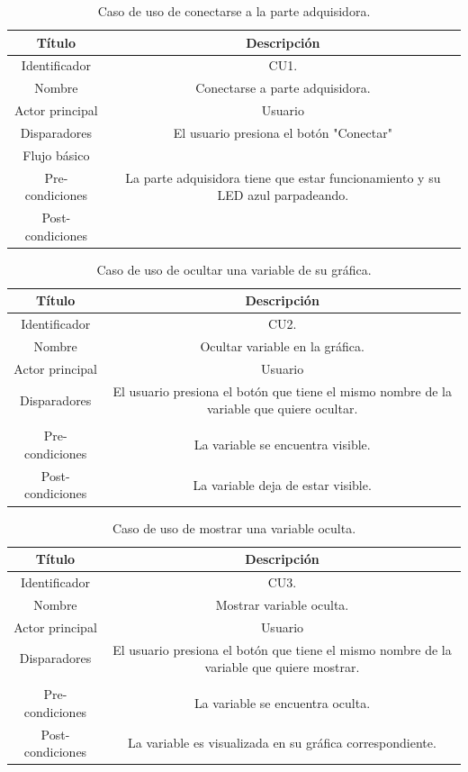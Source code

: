 \begin{table}
	\centering
	\caption{Caso de uso de conectarse a la parte adquisidora.}
	\centering
	\begin{tabular}{c c}    
		\toprule
		\textbf{Título }     & \textbf{Descripción} \\
		\midrule
		Identificador		&  CU1. \\
		Nombre				&   Conectarse a parte adquisidora. \\
		Actor principal		&   Usuario \\
		Disparadores		&   El usuario presiona el botón "Conectar" \\
		Flujo básico		&   \\
		Pre-condiciones		&   La parte adquisidora tiene que estar funcionamiento y su LED azul parpadeando. \\
		Post-condiciones	&   \\
		\bottomrule
	\end{tabular}
\label{tab:caso-conectar}
\end{table}

\begin{table}
	\centering
	\caption{Caso de uso de ocultar una variable de su gráfica.}
	\centering
	\begin{tabular}{c c}    
		\toprule
		\textbf{Título }     & \textbf{Descripción} \\
		\midrule
		Identificador		&  CU2. \\
		Nombre				&   Ocultar variable en la gráfica. \\
		Actor principal		&   Usuario \\
		Disparadores		&   El usuario presiona el botón que tiene el mismo nombre de la variable que quiere ocultar. \\
\\
		Pre-condiciones		&   La variable se encuentra visible. \\
		Post-condiciones	&   La variable deja de estar visible.\\
		\bottomrule
	\end{tabular}
\label{tab:caso-ocultar}
\end{table}

\begin{table}
	\centering
	\caption{Caso de uso de mostrar una variable oculta.}
	\centering
	\begin{tabular}{c c}    
		\toprule
		\textbf{Título }     & \textbf{Descripción} \\
		\midrule
		Identificador		&	CU3. \\
		Nombre				& 	Mostrar variable oculta. \\
		Actor principal		&   Usuario \\
		Disparadores		&   El usuario presiona el botón que tiene el mismo nombre de la variable que quiere mostrar. \\
\\
		Pre-condiciones		&   La variable se encuentra oculta. \\
		Post-condiciones	&   La variable es visualizada en su gráfica correspondiente.\\
		\bottomrule
	\end{tabular}
\label{tab:caso-mostrar}
\end{table}



